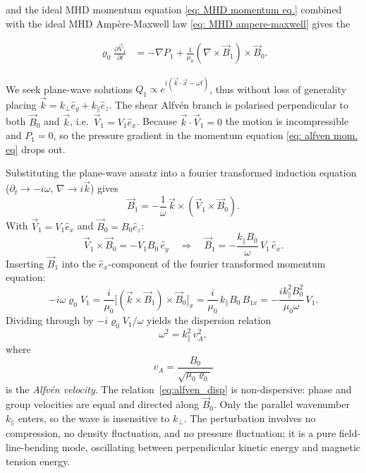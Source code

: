 and the ideal MHD momentum equation \eqref{eq: MHD momentum eq.}
combined with the ideal MHD Ampère-Maxwell law \eqref{eq: MHD ampere-maxwell} gives the 

\begin{align}
    \label{eq: alfven mom. eq}
    \varrho_0\frac{\partial\vec{V}_1}{\partial t}
        &= -\nabla P_1
          +\frac{1}{\mu_0}(\nabla\times\vec{B}_1)\times\vec{B}_0.
\end{align}


We seek plane-wave solutions $Q_1\propto e^{i(\vec{k}\cdot\vec{x}-\omega t)}$, thus without loss of generality
placing $\vec{k}=k_\perp\hat{e}_y+k_\parallel\hat{e}_z$.
The shear Alfv\'en branch is polarised perpendicular to both $\vec{B}_0$ and
$\vec{k}$, i.e.\ $\vec{V}_1 = V_1\hat{e}_x$.  Because $\vec{k}\cdot\vec{V}_1=0$
the motion is incompressible and $P_1=0$, so the pressure gradient in the momentum equation \eqref{eq: alfven mom. eq} drops out.

Substituting the plane-wave ansatz into a fourier transformed induction equation
($\partial_t\to -i\omega$, $\nabla\to i\vec{k}$) gives
%
\begin{equation*}
    \vec{B}_1
    = -\frac{1}{\omega}\,\vec{k}\times(\vec{V}_1\times\vec{B}_0).
\end{equation*}
%
With $\vec{V}_1 = V_1\hat{e}_x$ and $\vec{B}_0=B_0\hat{e}_z$:
%
\begin{equation*}
    \vec{V}_1\times\vec{B}_0 = -V_1 B_0\,\hat{e}_y
    \quad\Longrightarrow\quad
    \vec{B}_1
    = -\frac{k_\parallel B_0}{\omega}\,V_1\,\hat{e}_x.
\end{equation*}
%
Inserting $\vec{B}_1$ into the $\hat{e}_x$-component of the fourier transformed momentum equation:
%
\begin{equation*}
    -i\omega\varrho_0 V_1
    = \frac{i}{\mu_0}
      \bigl[(\vec{k}\times\vec{B}_1)\times\vec{B}_0\bigr]_x
    = \frac{i}{\mu_0}\,k_\parallel B_0\,B_{1x}
    = -\frac{i k_\parallel^2 B_0^2}{\mu_0\omega}\,V_1.
\end{equation*}
%
Dividing through by $-i\varrho_0 V_1/\omega$ yields the dispersion relation
%
\begin{equation}
    \omega^2 = k_\parallel^2\,v_A^2,
    \label{eq:alfven_disp}
\end{equation}
%
where
%
\begin{equation}
    v_A = \frac{B_0}{\sqrt{\mu_0\varrho_0}}
    \label{eq:va}
\end{equation}
%
is the \emph{Alfv\'en velocity}.  The relation~\eqref{eq:alfven_disp} is
non-dispersive: phase and group velocities are equal and directed along
$\vec{B}_0$.  Only the parallel wavenumber $k_\parallel$ enters, so the wave
is insensitive to $k_\perp$.  The perturbation involves no compression,
no density fluctuation, and no pressure fluctuation; it is a pure
field-line-bending mode, oscillating between perpendicular kinetic energy
and magnetic tension energy.


